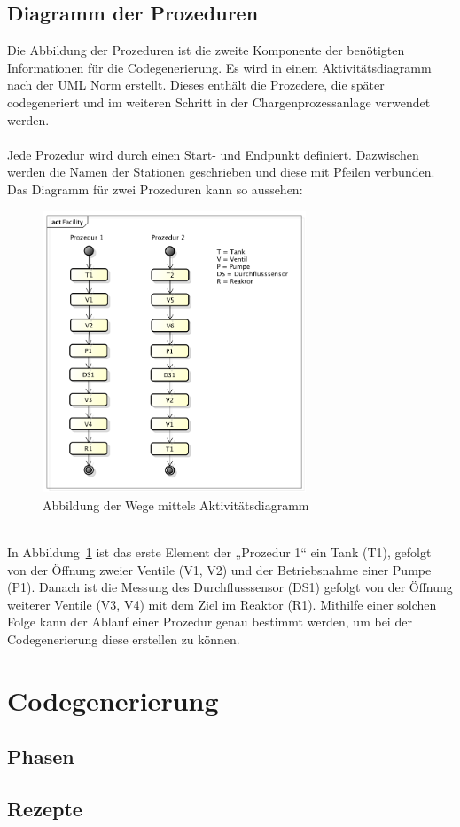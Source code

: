 \subsection{Diagramm der Prozeduren}
Die Abbildung der Prozeduren ist die zweite Komponente der benötigten Informationen für die Codegenerierung. Es wird in einem Aktivitätsdiagramm nach der UML Norm erstellt. Dieses enthält die Prozedere, die später codegeneriert und im weiteren Schritt in der Chargenprozessanlage verwendet werden. \\\\
Jede Prozedur wird durch einen Start- und Endpunkt definiert. Dazwischen werden die Namen der Stationen geschrieben und diese mit Pfeilen verbunden. Das Diagramm für zwei Prozeduren kann so aussehen: 
\begin{figure}[h!]
		\centering
		\includegraphics[width=0.7\textwidth]{graphics/konzept/UML_Activity.png}
		\caption{Abbildung der Wege mittels Aktivitätsdiagramm}
		\label{fig:konz_UML_Activity}
\end{figure}\\
In Abbildung~\ref{fig:konz_UML_Activity} ist das erste Element der „Prozedur 1“ ein Tank (T1), gefolgt von der Öffnung zweier Ventile (V1, V2) und der Betriebsnahme einer Pumpe (P1). Danach ist die Messung des Durchflusssensor (DS1) gefolgt von der Öffnung weiterer Ventile (V3, V4) mit dem Ziel im Reaktor (R1). 
Mithilfe einer solchen Folge kann der Ablauf einer Prozedur genau bestimmt werden, um bei der Codegenerierung diese erstellen zu können.
\section{Codegenerierung}
\subsection{Phasen}
\subsection{Rezepte}

